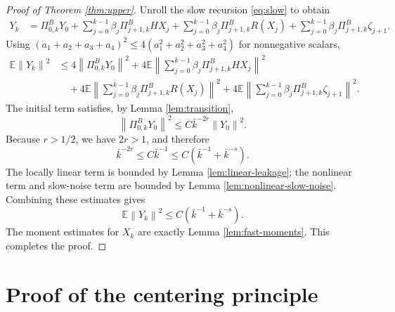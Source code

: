 \documentclass{article}
\newcommand{\E}{\mathbb{E}}
\newcommand{\norm}[1]{\left\lVert #1\right\rVert}
\begin{document}
\begin{proof}[Proof of Theorem \ref{thm:upper}]
Unroll the slow recursion \eqref{eq:slow} to obtain
\begin{align*}
  Y_k
  &=\Pi^B_{0,k}Y_0
    +\sum_{j=0}^{k-1}\beta_j\Pi^B_{j+1,k}HX_j
    +\sum_{j=0}^{k-1}\beta_j\Pi^B_{j+1,k}R(X_j)
    +\sum_{j=0}^{k-1}\beta_j\Pi^B_{j+1,k}\zeta_{j+1}.
\end{align*}
Using $(a_1+a_2+a_3+a_4)^2\le4(a_1^2+a_2^2+a_3^2+a_4^2)$ for nonnegative scalars,
\begin{align*}
  \E\norm{Y_k}^2
  &\le4\norm{\Pi^B_{0,k}Y_0}^2
    +4\E\left\|\sum_{j=0}^{k-1}\beta_j\Pi^B_{j+1,k}HX_j\right\|^2\\
  &\quad+4\E\left\|\sum_{j=0}^{k-1}\beta_j\Pi^B_{j+1,k}R(X_j)\right\|^2
    +4\E\left\|\sum_{j=0}^{k-1}\beta_j\Pi^B_{j+1,k}\zeta_{j+1}\right\|^2.
\end{align*}
The initial term satisfies, by Lemma \ref{lem:transition},
\[
  \norm{\Pi^B_{0,k}Y_0}^2\le C\bar k^{-2r}\norm{Y_0}^2.
\]
Because $r>1/2$, we have $2r>1$, and therefore
\[
  \bar k^{-2r}\le C\bar k^{-1}\le C(\bar k^{-1}+\bar k^{-s}).
\]
The locally linear term is bounded by Lemma \ref{lem:linear-leakage}; the nonlinear term and slow-noise term are bounded by Lemma \ref{lem:nonlinear-slow-noise}. Combining these estimates gives
\[
  \E\norm{Y_k}^2\le C\left(\bar k^{-1}+\bar k^{-s}\right).
\]
The moment estimates for $X_k$ are exactly Lemma \ref{lem:fast-moments}. This completes the proof.
\end{proof}


\section{Proof of the centering principle}\label{app:centering-proof}
\end{document}

